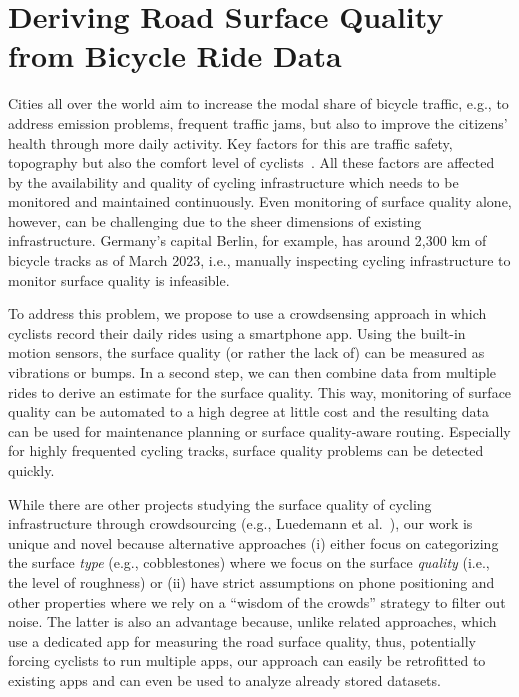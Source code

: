 \section{Deriving Road Surface Quality from Bicycle Ride Data}
\label{sec:cyclequality}


Cities all over the world aim to increase the modal share of bicycle traffic, e.g., to address emission problems, frequent traffic jams, but also to improve the citizens' health through more daily activity.
Key factors for this are traffic safety, topography but also the comfort level of cyclists~\cite{nyberg1996Road,gadsby2022understanding,karakaya2020simra}.
All these factors are affected by the availability and quality of cycling infrastructure which needs to be monitored and maintained continuously.
Even monitoring of surface quality alone, however, can be challenging due to the sheer dimensions of existing infrastructure.
Germany's capital Berlin, for example, has around 2,300 km of bicycle tracks as of March 2023, i.e., manually inspecting cycling infrastructure to monitor surface quality is infeasible.

To address this problem, we propose to use a crowdsensing approach in which cyclists record their daily rides using a smartphone app.
Using the built-in motion sensors, the surface quality (or rather the lack of) can be measured as vibrations or bumps.
In a second step, we can then combine data from multiple rides to derive an estimate for the surface quality.
This way, monitoring of surface quality can be automated to a high degree at little cost and the resulting data can be used for maintenance planning or surface quality-aware routing.
Especially for highly frequented cycling tracks, surface quality problems can be detected quickly.

While there are other projects studying the surface quality of cycling infrastructure through crowdsourcing (e.g., Luedemann et al.~\cite{luedemann2022bikevibes}), our work is unique and novel because alternative approaches (i) either focus on categorizing the surface \emph{type} (e.g., cobblestones) where we focus on the surface \emph{quality} (i.e., the level of roughness) or (ii) have strict assumptions on phone positioning and other properties where we rely on a ``wisdom of the crowds'' strategy to filter out noise.
The latter is also an advantage because, unlike related approaches, which use a dedicated app for measuring the road surface quality, thus, potentially forcing cyclists to run multiple apps, our approach can easily be retrofitted to existing apps and can even be used to analyze already stored datasets.

